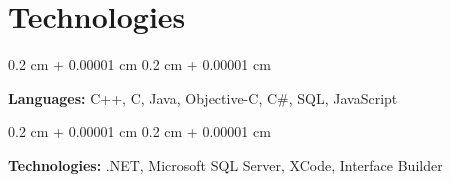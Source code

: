 \documentclass[10pt, letterpaper]{article}
\newenvironment{onecolentry}{
    \begin{adjustwidth}{
        0.2 cm + 0.00001 cm
    }{
        0.2 cm + 0.00001 cm
    }
}{
    \end{adjustwidth}
} %
\begin{document}
    
    \section{Technologies}



        
        \begin{onecolentry}
            \textbf{Languages:} C++, C, Java, Objective-C, C\#, SQL, JavaScript
        \end{onecolentry}

        \vspace{0.2 cm}

        \begin{onecolentry}
            \textbf{Technologies:} .NET, Microsoft SQL Server, XCode, Interface Builder
        \end{onecolentry}


    
\end{document}
